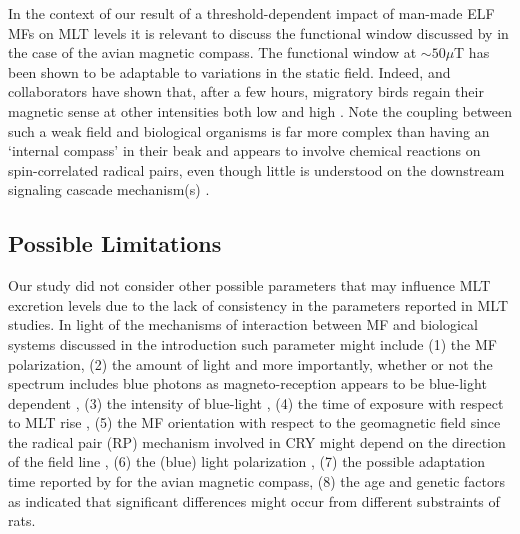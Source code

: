 \documentclass[letter,twoside]{article}
\begin{document}
In the context of our result of a threshold-dependent impact of man-made ELF MFs on MLT levels 
 it is relevant to  discuss the functional window discussed  by \citet{Wiltschko2014} 
in the case of the   avian magnetic compass. The functional window  at $\sim50\mu$T has been shown to be adaptable to variations in the static field.
Indeed, \citet{Wiltschko2014} and collaborators have shown that, after a few hours, migratory birds regain their magnetic sense at other intensities both low \citep[e.g.][as low as 4$\mu$T]{Winklhofer2013} and high \citep[][up to 92$\mu$T]{Wiltschko2006}. Note the coupling between such a weak field and biological organisms \citep[e.g.][]{ Kattnig2017,Hore2016,Ritz2000,Vanderstraeten2010,Vanderstraeten2018} is far more complex than having  an `internal compass' in their beak and appears to involve chemical reactions on spin-correlated radical pairs, even though  little is understood on the downstream signaling cascade mechanism(s)  \citep[as reviewed in][]{Nordmann2017}.
 

\subsection*{Possible Limitations}
\label{section:limitations}

Our study did not consider other possible parameters that may influence MLT excretion levels due to the lack of consistency in the parameters reported in MLT studies.
In light of the mechanisms of interaction between MF and biological systems discussed in the introduction %
such parameter might include
 (1) the MF polarization, 
 (2) the amount of light and more importantly, whether or not the spectrum includes blue photons  as magneto-reception appears to be blue-light dependent \citep[e.g.][]{Chasmore1999,Chaves2011,Gegear2008,Michael2017,Ritz2000,Vanderstraeten2018}, 
 (3) the intensity of blue-light \citep[as magneto-reception might be inversely proportional to the photon flux, e.g.][]{Vanderstraeten2018},
 (4) the  time of exposure with respect to MLT rise \citep[as suggested by][]{Wood1998,Vanderstraeten2012},
  (5) the  MF orientation with respect to the geomagnetic field since the radical pair (RP) mechanism involved in CRY
might depend on the direction of the field line \citep{Wiltschko2014,Zhang2015},
 (6)  the (blue) light polarization \citep[as discussed in][]{Stoneham2012,Hore2016},
 (7) the possible adaptation time reported by \citet{Wiltschko2014} for the avian magnetic compass,
 (8) the age \citep{Vanderstraeten2012} and genetic factors as \citet{Fedrowitz2004} indicated that significant differences might occur from different substraints of rats.
 
\end{document}
